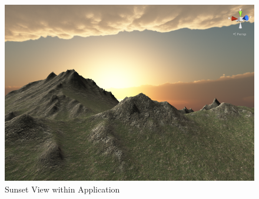 \documentclass[12pt]{article}
\begin{document}
 \begin{figure}[h]
    \centering
 \includegraphics[width=.7\textwidth]{Software11}
  \caption{Sunset View within Application}
  \label{fig:sunset}
 \end{figure}











\nocite{mihelj}
\nocite{okita}
\nocite{craig}
\nocite{lavieri}
\nocite{parisi}
\nocite{parisi}
\nocite{benton}
\nocite{jackson}
\nocite{blackman}
\nocite{hocking}
\nocite{linowes}
\nocite{fuchs1}
\nocite{gobbetti}


\nocite{photo1_sutehrland}
\nocite{applications}
\nocite{cardboard}
\nocite{CAVE}
\nocite{haptics}
\nocite{oculus}
\nocite{pov}
\nocite{reticle}
\nocite{sound}






\end{document}
